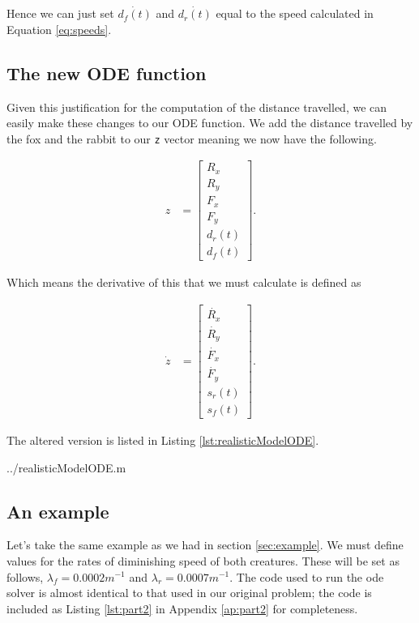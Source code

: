 Hence we can just set $\dot{d_f(t)}$ and $\dot{d_r(t)}$ equal to the speed calculated in Equation \ref{eq:speeds}. 

\subsection{The new ODE function}

Given this justification for the computation of the distance travelled, we can easily make these changes to our ODE function. We add the distance travelled by the fox and the rabbit to our \texttt{z} vector meaning we now have the following. 

\begin{align}\nonumber
    z &= \begin{bmatrix}
           R_x \\
           R_y \\
           F_x \\
           F_y \\
	   d_r(t) \\
	  d_f(t)
         \end{bmatrix}.
  \end{align}

Which means the derivative of this that we must calculate is defined as

\begin{align}\nonumber
    \dot{z} &= \begin{bmatrix}
            \dot{R_x} \\
            \dot{R_y} \\
            \dot{F_x} \\
            \dot{F_y} \\
	   s_r(t) \\
	   s_f(t)
         \end{bmatrix}.
  \end{align}
 

The altered version is listed in Listing \ref{lst:realisticModelODE}.

  {../realisticModelODE.m}

\subsection{An example}

Let's take the same example as we had in section \ref{sec:example}. We must define values for the rates of diminishing speed of both creatures. These will be set as follows, $\lambda_f =0.0002 m^{-1}$ and  $\lambda_r =0.0007 m^{-1}$. The code used to run the ode solver is almost identical to that used in our original problem; the code is included as Listing \ref{lst:part2} in Appendix \ref{ap:part2} for completeness.

